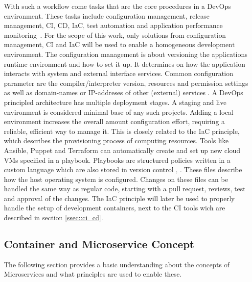 \documentclass[12pt, a4paper]{article}
\begin{document}
        \noindent With such a workflow come tasks that are the core procedures in a DevOps environment. These tasks include configuration management, release management, \ac{CI}, \ac{CD}, \ac{IaC}, test automation and application performance monitoring~\cite{azuredevops}.\newline
        For the scope of this work, only solutions from configuration management, \ac{CI} and \ac{IaC} will be used to enable a homogeneous development environment. The configuration management is about versioning the applications runtime environment and how to set it up. It determines on how the application interacts with system and external interface services. Common configuration parameter are the compiler/interpreter version, resources and permission settings as well as domain-names or \acs{IP}-addreses of other (external) services \cite{base_devops}. A DevOps principled architecture has multiple deployment stages. A staging and live environment is considered minimal base of any such projects. Adding a local environment increases the overall amount configuration effort, requiring a reliable, efficient way to manage it. This is closely related to the \ac{IaC} principle, which describes the provisioning process of computing resources. Tools like Ansible, Puppet and Terraform can automatically create and set up new cloud \ac{VM}s specified in a playbook. Playbooks are structured policies written in a custom language which are also stored in version control \cite{ansible2020}, \cite{azuredevops}.\newline
        These files describe how the host operating system is configured. Changes on these files can be handled the same way as regular code, starting with a pull request, reviews, test and approval of the changes. The \acl{IaC} principle will later be used to properly handle the setup of development containers, next to the \acs{CI} tools wich are described in section \ref{ssec::ci_cd}.

    \subsection{Container and Microservice Concept}\label{ssec::microservices}
    The following section provides a basic understanding about the concepts of Microservices and what principles are used to enable these.
\end{document}
